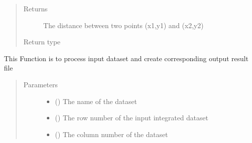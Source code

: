 \documentclass[letterpaper,10pt,english]{sphinxmanual}
\begin{document}
\begin{fulllineitems}
\begin{fulllineitems}
\begin{quote}
\begin{description}
\begin{itemize}
\end{itemize}

\item[{Returns}] \leavevmode
The distance between two points (x1,y1) and (x2,y2)

\item[{Return type}] \leavevmode
{}

\end{description}\end{quote}

\end{fulllineitems}


\begin{fulllineitems}
\label{\detokenize{AgentTools.util:AgentTools.util.OutputUtil.OutputUtil.process_output_file}}
This Function is to process input dataset  and create corresponding output result file
\begin{quote}\begin{description}
\item[{Parameters}] \leavevmode\begin{itemize}
\item {} 
 () \textendash{} The name of the dataset

\item {} 
 () \textendash{} The row number of the input integrated dataset

\item {} 
 () \textendash{} The column number of the dataset


\end{itemize}
\end{description}
\end{quote}
\end{fulllineitems}
\end{fulllineitems}
\end{document}
